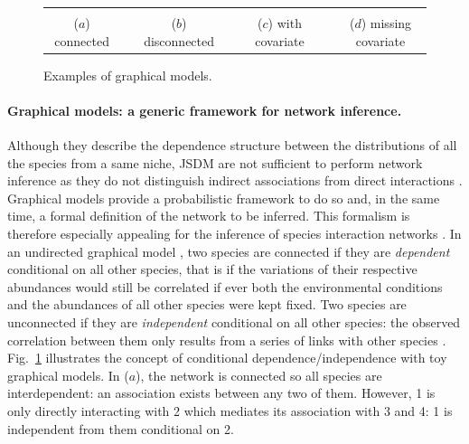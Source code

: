 \begin{figure}[H]
    \centering
    \begin{tabular}{ccccccc}
         & \qquad &
         & \qquad &
         & \qquad &
         \\
        ($a$) connected & & ($b$) disconnected & & ($c$) with covariate & & ($d$) missing covariate 
    \end{tabular}
    \caption{Examples of graphical models. }
    \label{fig:graphmodel}
\end{figure}

\paragraph{Graphical models: a generic framework for network inference.}
Although they describe the dependence structure between the distributions of all the species from a same niche, JSDM are not sufficient to perform network inference as they do not distinguish  indirect associations from direct interactions \citep{DBD18}. Graphical models \citep{Lau96} provide a probabilistic framework to do so and, in the same time, a formal definition of the network to be inferred. This formalism is therefore especially appealing for the inference of species interaction networks \citep{PWT19}.
In an undirected graphical model \citep[which is the same as a Markov random field:][]{CWL18}, two species are connected if they are {\sl dependent} conditional on all other species, that is if the variations of their respective abundances would still be  correlated if ever both the environmental conditions and the abundances of all other species were kept fixed. Two species are unconnected if they are {\sl independent} conditional on all other species: the observed correlation between them only results from a series of links with other species \citep{morueta2016network}  . 
Fig.~\ref{fig:graphmodel} illustrates the concept of conditional dependence/independence with toy graphical models. In ($a$), the network is connected so all species are interdependent: an association exists between any two of them. However, 1 is only directly interacting with 2 which mediates its association with 3 and 4: 1 is independent from them conditional on 2.

